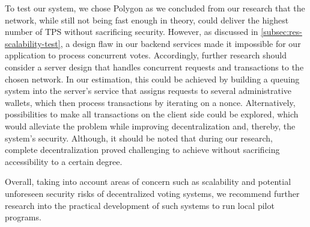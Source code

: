 To test our system, we chose Polygon as we concluded from our research that the network, while still not being fast enough in theory, could deliver the highest number of \gls{TPS} without sacrificing security.
However, as discussed in \cref{subsec:res-scalability-test}, a design flaw in our backend services made it impossible for our application to process concurrent votes.
Accordingly, further research should consider a server design that handles concurrent requests and transactions to the chosen network.
In our estimation, this could be achieved by building a queuing system into the server’s service that assigns requests to several administrative wallets, which then process transactions by iterating on a nonce.
Alternatively, possibilities to make all transactions on the client side could be explored, which would alleviate the problem while improving decentralization and, thereby, the system’s security.
Although, it should be noted that during our research, complete decentralization proved challenging to achieve without sacrificing accessibility to a certain degree.

Overall, taking into account areas of concern such as scalability and potential unforeseen security risks of decentralized voting systems, we recommend further research into the practical development of such systems to run local pilot programs.

